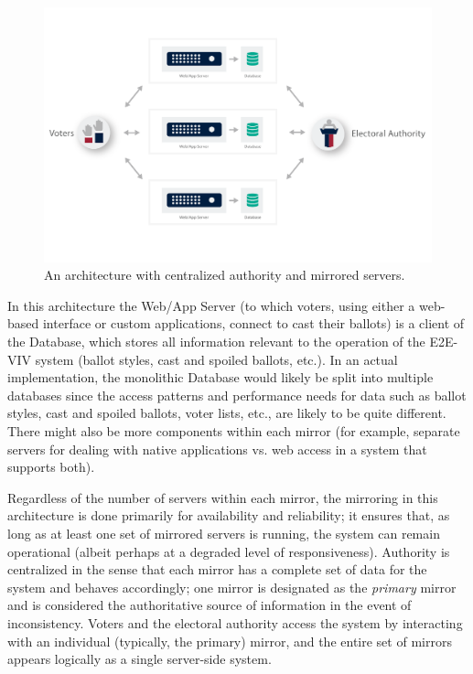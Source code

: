 \begin{figure}[t]
\begin{center}
\includegraphics[width=6.5in]{architecture_resources/mirrored-servers.pdf}
\end{center}
\vspace*{-10ex}
\caption{An architecture with centralized authority and mirrored
  servers.}
\label{figure:arch-mirrored-servers}
\end{figure}

In this architecture the Web/App Server (to which voters, using either
a web-based interface or custom applications, connect to cast their
ballots) is a client of the Database, which stores all information
relevant to the operation of the E2E-VIV system (ballot styles, cast
and spoiled ballots, etc.). In an actual implementation, the
monolithic Database would likely be split into multiple databases
since the access patterns and performance needs for data such as
ballot styles, cast and spoiled ballots, voter lists, etc., are likely
to be quite different. There might also be more components within each
mirror (for example, separate servers for dealing with native
applications vs. web access in a system that supports both).

Regardless of the number of servers within each mirror, the mirroring
in this architecture is done primarily for availability and
reliability; it ensures that, as long as at least one set of mirrored
servers is running, the system can remain operational (albeit perhaps
at a degraded level of responsiveness). Authority is centralized in
the sense that each mirror has a complete set of data for the system
and behaves accordingly; one mirror is designated as the
\emph{primary} mirror and is considered the authoritative source of
information in the event of inconsistency. Voters and the electoral
authority access the system by interacting with an individual
(typically, the primary) mirror, and the entire set of mirrors appears
logically as a single server-side system.

